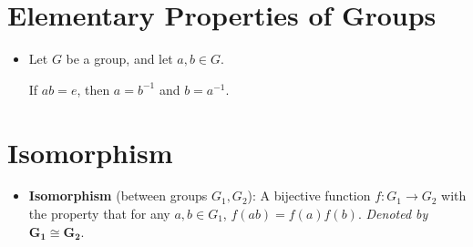 \documentclass[../notes.tex]{subfiles}
\begin{document}
\chapter{Elementary Properties of Groups}
\begin{itemize}
    \item {}Let $G$ be a group, and let $a,b\in G$.
    \begin{theorem}
        If $ab=e$, then $a=b^{-1}$ and $b=a^{-1}$.
    \end{theorem}
\end{itemize}



\setcounter{chapter}{8}
\chapter{Isomorphism}
\begin{itemize}
    \item {}\textbf{Isomorphism} (between groups $G_1,G_2$): A bijective function $f:G_1\to G_2$ with the property that for any $a,b\in G_1$, $f(ab)=f(a)f(b)$. \emph{Denoted by} $\bm{G_1\cong G_2}$.
\end{itemize}
\end{document}
